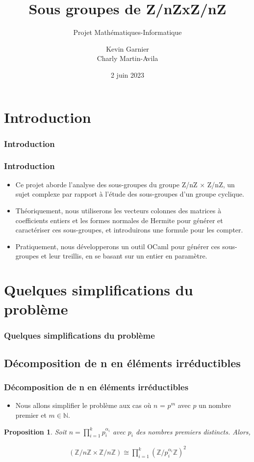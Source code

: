 \documentclass{beamer}
\newtheorem{prp}{Proposition}
\begin{document}
\title{
    Sous groupes de Z/nZxZ/nZ
}
\subtitle{Projet Mathématiques-Informatique}
\author[Kevin, Charly]{
    Kevin Garnier \\    Charly Martin-Avila
}
\date{2 juin 2023}


\tableofcontents


\section{Introduction}
\begin{frame}
\frametitle{Introduction}
\tableofcontents[currentsection]
\end{frame}


\begin{frame}
\frametitle{Introduction}
\begin{itemize}
    \item Ce projet aborde l'analyse des sous-groupes du groupe Z/nZ × Z/nZ, un sujet complexe par rapport à l'étude des sous-groupes d'un groupe cyclique.
    \item Théoriquement, nous utiliserons les vecteurs colonnes des matrices à coefficients entiers et les formes normales de Hermite pour générer et caractériser ces sous-groupes, et introduirons une formule pour les compter.
    \item Pratiquement, nous développerons un outil OCaml pour générer ces sous-groupes et leur treillis, en se basant sur un entier en paramètre.
\end{itemize}
\end{frame}


\section{Quelques simplifications du problème}
\begin{frame}
\frametitle{Quelques simplifications du problème}
\tableofcontents[currentsection]
\end{frame}


\subsection{Décomposition de n en éléments irréductibles}
\begin{frame}
    \frametitle{Décomposition de n en éléments irréductibles}
    \begin{itemize}
        \item Nous allons simplifier le problème aux cas où $n$ = $p ^ {m}$ avec $p$ un nombre premier et $m \in \mathbb{N}$.
    \end{itemize}
    \begin{prp}
        Soit $n = \prod\limits_{i = 1}^k p_i^{\alpha_i}$ avec $p_i$ des nombres premiers distincts. Alors,
    
        \begin{align*}
            (\mathbb{Z}/n\mathbb{Z} \times \mathbb{Z}/n\mathbb{Z})
            \cong
            \prod\limits_{i = 1}^k (\mathbb{Z}/p_i^{\alpha_i}\mathbb{Z})^{2}
        \end{align*}
    \end{prp}
\end{frame}
\end{document}
